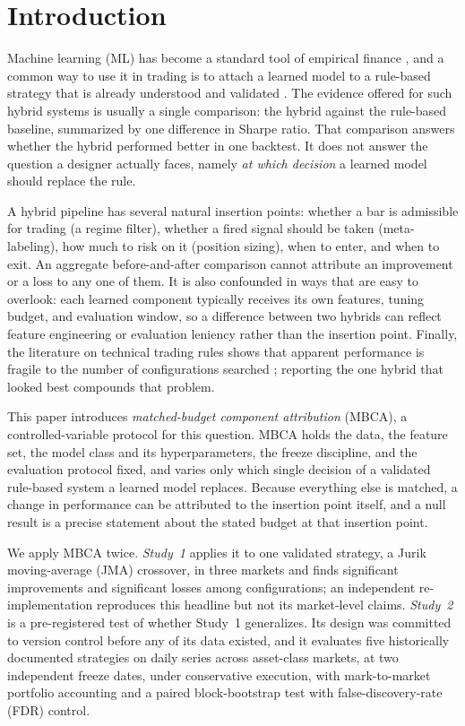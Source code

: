 \section{Introduction}
\label{sec:intro}

Machine learning (ML) has become a standard tool of empirical finance \cite{gu2020empirical}, and a common way to
use it in trading is to attach a learned model to a rule-based strategy that is already understood and validated
\cite{lopezdeprado2018afml,joubert2022metalabeling}. The evidence offered for such hybrid systems is usually a single
comparison: the hybrid against the rule-based baseline, summarized by one difference in Sharpe ratio. That comparison
answers whether the hybrid performed better in one backtest. It does not answer the question a designer actually faces,
namely \emph{at which decision} a learned model should replace the rule.

A hybrid pipeline has several natural insertion points: whether a bar is admissible for trading (a regime filter),
whether a fired signal should be taken (meta-labeling), how much to risk on it (position sizing), when to enter, and
when to exit. An aggregate before-and-after comparison cannot attribute an improvement or a loss to any one of them.
It is also confounded in ways that are easy to overlook: each learned component typically receives its own features,
tuning budget, and evaluation window, so a difference between two hybrids can reflect feature engineering or
evaluation leniency rather than the insertion point. Finally, the literature on technical trading rules shows that
apparent performance is fragile to the number of configurations searched
\cite{sullivan1999data,white2000reality,harvey2016cross}; reporting the one hybrid that looked best compounds that
problem.

This paper introduces \emph{matched-budget component attribution} (MBCA), a controlled-variable protocol for this
question. MBCA holds the data, the feature set, the model class and its hyperparameters, the freeze discipline, and
the evaluation protocol fixed, and varies only which single decision of a validated rule-based system a learned model
replaces. Because everything else is matched, a change in performance can be attributed to the insertion point
itself, and a null result is a precise statement about the stated budget at that insertion point.

We apply MBCA twice. \emph{Study~1} applies it to one validated strategy, a Jurik moving-average (JMA) crossover, in
three markets and finds \SoneSigGain{} significant improvements and \SoneSigLoss{} significant losses among
\SoneConfigs{} configurations; an independent re-implementation reproduces this headline but not its market-level
claims. \emph{Study~2} is a pre-registered test \cite{nosek2018preregistration} of whether Study~1 generalizes. Its
design was committed to version control before any of its data existed, and it evaluates five historically documented
strategies on \STwoInstruments{} daily series across \STwoMarkets{} asset-class markets, at two independent freeze
dates, under conservative execution, with mark-to-market portfolio accounting and a paired block-bootstrap test with
false-discovery-rate (FDR) control.

